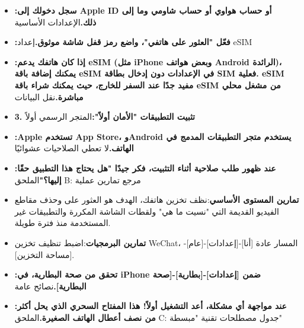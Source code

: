 

\begin{itemize}
  \item \textbf{:سجل دخولك إلى Apple ID أو حساب هواوي أو حساب شاومي وما إلى ذلك.}الإعدادات الأساسية
  \item \textbf{:فعّل "العثور على هاتفي"، واضع رمز قفل شاشة موثوق.}إعداد eSIM
  \item \textbf{:إذا كان هاتفك يدعم eSIM (مثل iPhone وبعض هواتف Android الرائدة)، يمكنك إضافة باقة eSIM في الإعدادات دون إدخال بطاقة SIM فعلية. eSIM مفيد جدًا عند السفر للخارج، حيث يمكنك شراء باقة eSIM من مشغل محلي مباشرة.}نقل البيانات
\end{itemize}


\begin{itemize}
  \item \textbf{3. تثبيت التطبيقات "الأمان أولاً":}المتجر الرسمي أولاً
  \item \textbf{:Apple تستخدم App Store، وAndroid يستخدم متجر التطبيقات المدمج في الهاتف.}لا تعطي الصلاحيات عشوائيًا
  \item \textbf{:عند ظهور طلب صلاحية أثناء التثبيت، فكر جيدًا "هل يحتاج هذا التطبيق حقًا إليها؟"}الملحق B: مرجع تمارين عملية
  \item \textbf{تمارين المستوى الأساسي}:نظف تخزين هاتفك، الهدف هو العثور على وحذف مقاطع الفيديو القديمة التي "نسيت ما هي" ولقطات الشاشة المكررة والتطبيقات غير المستخدمة منذ فترة طويلة.
  \item \textbf{تمارين البرمجيات}:اضبط تنظيف تخزين WeChat، المسار عادة [أنا]-[إعدادات]-[عام]-[مساحة التخزين].
\end{itemize}


\begin{itemize}
  \item \textbf{:تحقق من صحة البطارية، في iPhone ضمن [إعدادات]-[بطارية]-[صحة البطارية].}نصائح عامة
  \item \textbf{:عند مواجهة أي مشكلة، أعد التشغيل أولاً! هذا المفتاح السحري الذي يحل أكثر من نصف أعطال الهاتف الصغيرة.}الملحق C: جدول مصطلحات تقنية "مبسطة"
\end{itemize}
